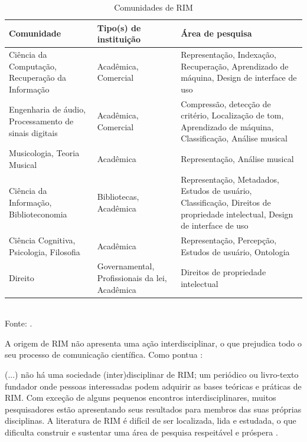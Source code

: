 \begin{table}[h]
    \centering
    \caption{Comunidades de RIM}
    \begin{tabular}{|p{4cm}|p{4cm}|p{4cm}|}
    \hline
        Comunidade & Tipo(s) de instituição & Área de pesquisa \\
    \hline
        Ciência da Computação, Recuperação da Informação & Acadêmica, Comercial & Representação, Indexação, Recuperação, Aprendizado de máquina, Design de interface de uso \\
    \hline
        Engenharia de áudio, Processamento de sinais digitais & Acadêmica, Comercial & Compressão, detecção de critério, Localização de tom, Aprendizado de máquina, Classificação, Análise musical \\
    \hline
        Musicologia, Teoria Musical & Acadêmica & Representação, Análise musical \\
    \hline
        Ciência da Informação, Biblioteconomia & Bibliotecas, Acadêmica & Representação, Metadados, Estudos de usuário, Classificação, Direitos de propriedade intelectual, Design de interface de uso \\
    \hline
        Ciência Cognitiva, Psicologia, Filosofia & Acadêmica & Representação, Percepção, Estudos de usuário, Ontologia \\
    \hline
        Direito & Governamental, Profissionais da lei, Acadêmica & Direitos de propriedade intelectual \\
    \hline
    \end{tabular}
    \label{tab:comunidadeRim}
    \\Fonte: .
\end{table}

A origem de RIM não apresenta uma ação interdisciplinar, o que prejudica todo o seu processo de comunicação científica. Como pontua :

\begin{citacao}
(...) não há uma sociedade (inter)disciplinar de RIM; um periódico ou livro-texto fundador onde pessoas interessadas podem adquirir as bases teóricas e práticas de RIM. Com exceção de alguns pequenos encontros interdisciplinares, muitos pesquisadores estão apresentando seus resultados para membros das suas próprias disciplinas. A literatura de RIM é difícil de ser localizada, lida e estudada, o que dificulta construir e sustentar uma área de pesquisa respeitável e próspera \cite{santini&souza2007}.
\end{citacao}

